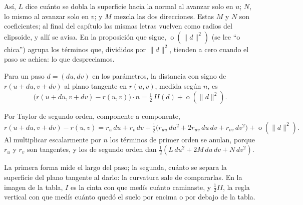 Así, \(L\) dice cuánto se dobla la superficie hacia la normal al avanzar solo en \(u\); \(N\),
lo mismo al avanzar solo en \(v\); y \(M\) mezcla las dos direcciones. Estas \(M\) y \(N\) son
coeficientes; al final del capítulo las mismas letras vuelven como radios del elipsoide, y
allí se avisa. En la proposición que sigue, \(\operatorname{o}(\lVert d\rVert^2)\) (se lee
\enquote{o chica}) agrupa los términos que, divididos por \(\lVert d\rVert^2\), tienden a cero
cuando el paso se achica: lo que despreciamos.

\begin{proposicion}\label{prop:II-taylor}
Para un paso \(d=(du,dv)\) en los parámetros, la distancia con signo de \(r(u+du,v+dv)\) al
plano tangente en \(r(u,v)\), medida según \(n\), es
\[
  \bigl(r(u+du,v+dv)-r(u,v)\bigr)\cdot n=\tfrac12\,II(d)+\operatorname{o}(\lVert d\rVert^2).
\]
\end{proposicion}

\begin{demostracion}
Por Taylor de segundo orden, componente a componente,
\[
  r(u+du,v+dv)-r(u,v)=r_u\,du+r_v\,dv
  +\tfrac12\bigl(r_{uu}\,du^2+2r_{uv}\,du\,dv+r_{vv}\,dv^2\bigr)+\operatorname{o}(\lVert d\rVert^2).
\]
Al multiplicar escalarmente por \(n\) los términos de primer orden se anulan, porque \(r_u\) y
\(r_v\) son tangentes, y los de segundo orden dan \(\tfrac12(L\,du^2+2M\,du\,dv+N\,dv^2)\).
\end{demostracion}

La primera forma mide el largo del paso; la segunda, cuánto se separa la superficie del plano
tangente al darlo: la curvatura sale de compararlas. En la imagen de la tabla, \(I\) es la cinta
con que medís cuánto caminaste, y \(\tfrac12II\), la regla vertical con que medís cuánto quedó
el suelo por encima o por debajo de la tabla.

